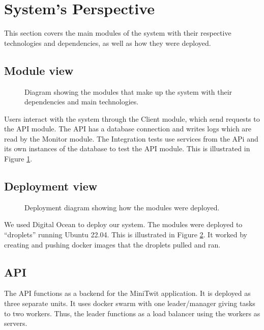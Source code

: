 \section{System's Perspective}
\label{ch:sys_persp} %

This section covers the main modules of the system with their  
respective technologies and dependencies, as well as how they
were deployed.

\subsection{Module view}

\begin{figure}[H]
    \centering
    
    \caption{Diagram showing the modules that make up the system with
    their dependencies and main technologies.}
    \label{fig:modules}
\end{figure}

Users interact with the system through the Client module,
which send requests to the API module. The API has a database 
connection and writes logs which are read by the Monitor module.
The Integration tests use services from the APi and its own instances
of the database to test the API module.
This is illustrated in Figure \ref{fig:modules}.

\subsection{Deployment view}

\begin{figure}[H]
      \centering
      
      \caption{Deployment diagram showing how the modules were deployed.}
      \label{fig:deployment_diagram}
\end{figure}

We used Digital Ocean to deploy our system.
The modules were deployed to ``droplets'' running Ubuntu 22.04.
This is illustrated in Figure \ref{fig:deployment_diagram}.
It worked by creating and pushing docker images that the 
droplets pulled and ran.

\subsection{API}

The API functions as a backend for the MiniTwit application.
It is deployed as three separate units. 
It uses docker swarm with one leader/manager 
giving tasks to two workers. Thus, the leader functions as a 
load balancer using the workers as servers. 

